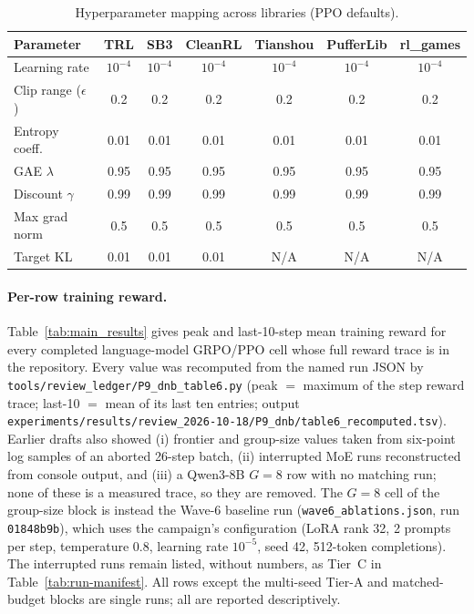 \begin{table}[ht]
\centering
\caption{Hyperparameter mapping across libraries (PPO defaults).}
\label{tab:hyperparams}
\small
\setlength{\tabcolsep}{4pt}
\begin{tabular}{lcccccc}
\toprule
\textbf{Parameter} & \textbf{TRL} & \textbf{SB3} & \textbf{CleanRL} & \textbf{Tianshou} & \textbf{PufferLib} & \textbf{rl\_games} \\
\midrule
Learning rate & $10^{-4}$ & $10^{-4}$ & $10^{-4}$ & $10^{-4}$ & $10^{-4}$ & $10^{-4}$ \\
Clip range ($\epsilon$) & 0.2 & 0.2 & 0.2 & 0.2 & 0.2 & 0.2 \\
Entropy coeff. & 0.01 & 0.01 & 0.01 & 0.01 & 0.01 & 0.01 \\
GAE $\lambda$ & 0.95 & 0.95 & 0.95 & 0.95 & 0.95 & 0.95 \\
Discount $\gamma$ & 0.99 & 0.99 & 0.99 & 0.99 & 0.99 & 0.99 \\
Max grad norm & 0.5 & 0.5 & 0.5 & 0.5 & 0.5 & 0.5 \\
Target KL & 0.01 & 0.01 & 0.01 & N/A & N/A & N/A \\
\bottomrule
\end{tabular}
\end{table}

\paragraph{Per-row training reward.}
Table~\ref{tab:main_results} gives peak and last-10-step mean training
reward for every completed language-model GRPO/PPO cell whose full reward
trace is in the repository. Every value was recomputed from the named run
JSON by \texttt{tools/\allowbreak{}review\_ledger/\allowbreak{}P9\_dnb\_table6.py} (peak $=$ maximum of
the step reward trace; last-10 $=$ mean of its last ten entries; output
\texttt{experiments/\allowbreak{}results/\allowbreak{}review\_2026-10-18/\allowbreak{}P9\_dnb/\allowbreak{}table6\_recomputed.tsv}).
Earlier drafts also showed (i) frontier and group-size values taken from
six-point log samples of an aborted 26-step batch, (ii) interrupted MoE
runs reconstructed from console output, and (iii) a Qwen3-8B $G{=}8$ row
with no matching run; none of these is a measured trace, so they are
removed. The $G{=}8$ cell of the group-size block is instead the Wave-6
baseline run (\texttt{wave6\_ablations.json}, run \texttt{01848b9b}), which
uses the campaign's configuration (LoRA rank 32, 2 prompts per step,
temperature 0.8, learning rate $10^{-5}$, seed 42, 512-token completions). The interrupted runs remain listed, without numbers, as Tier~C in
Table~\ref{tab:run-manifest}. All rows except the multi-seed Tier-A and
matched-budget blocks are single runs; all are reported descriptively.

